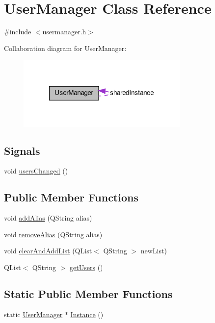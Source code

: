 \hypertarget{class_user_manager}{
\section{UserManager Class Reference}
\label{class_user_manager}
}


{\ttfamily \#include $<$usermanager.h$>$}



Collaboration diagram for UserManager:\nopagebreak
\begin{figure}[H]
\begin{center}
\leavevmode
\includegraphics[width=239pt]{class_user_manager__coll__graph}
\end{center}
\end{figure}
\subsection*{Signals}
\begin{DoxyCompactItemize}
\item 
void \hyperlink{class_user_manager_ac7774b1192a8db594517cf631fe0c08a}{usersChanged} ()
\end{DoxyCompactItemize}
\subsection*{Public Member Functions}
\begin{DoxyCompactItemize}
\item 
void \hyperlink{class_user_manager_a780d759b88a1df9070237c4da773f715}{addAlias} (QString alias)
\item 
void \hyperlink{class_user_manager_aa095606be17b14abee1eb54571f7e910}{removeAlias} (QString alias)
\item 
void \hyperlink{class_user_manager_a4987a113b6fa6ce064813eac0d6b039b}{clearAndAddList} (QList$<$ QString $>$ newList)
\item 
QList$<$ QString $>$ \hyperlink{class_user_manager_ab575adde2f4f4702fb9e88c6cac27be2}{getUsers} ()
\end{DoxyCompactItemize}
\subsection*{Static Public Member Functions}
\begin{DoxyCompactItemize}
\item 
static \hyperlink{class_user_manager}{UserManager} $\ast$ \hyperlink{class_user_manager_a6effcea7c87ee21cf1335219fd2f6a52}{Instance} ()
\end{DoxyCompactItemize}


